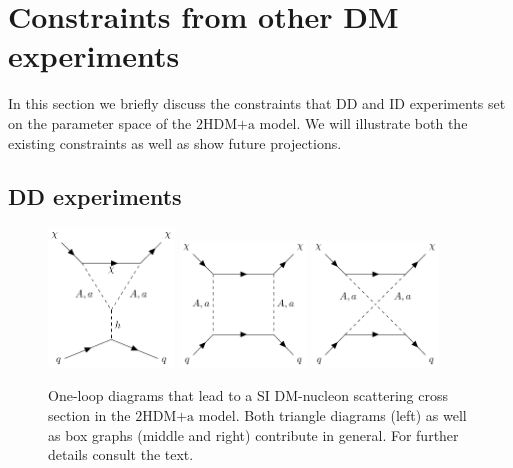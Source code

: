 \documentclass[a4paper, 11pt,notoc]{article}
\newcommand{\hdma}{\ensuremath{\textrm{2HDM+a}}\xspace}
\begin{document}

\section{Constraints from other DM experiments}
\label{sec:DMdetection}

In this section we briefly discuss the constraints that DD and ID experiments set on the parameter space of the \hdma model. We will illustrate both the existing constraints as well as show future projections. 

\subsection{DD experiments}

\begin{figure}[t!]
    \centering
    \includegraphics[width=0.3\textwidth]{pseudoTriangle.pdf} \quad 
    \includegraphics[width=0.3\textwidth]{pseudoBox.pdf} \quad 
    \includegraphics[width=0.3\textwidth]{pseudoBox2.pdf} 
    \vspace{4mm}
    \caption{One-loop diagrams that lead to a SI DM-nucleon scattering cross section in the \hdma model.  Both triangle diagrams (left) as well as box graphs (middle and right) contribute in general. For further details consult the text. }
    \label{fig:feynDDPS}
\end{figure}
\end{document}
